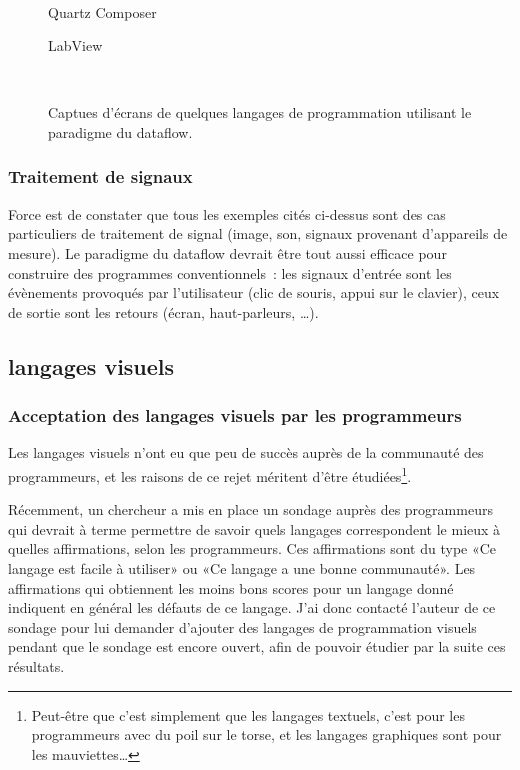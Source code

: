 \documentclass{article}
\begin{document}
\begin{figure}[ht]
  
  {\,}
  \hfill 
  \begin{minipage}{5cm}
    \centering
    \caption{Quartz Composer\cite{quartz-composer}}
    \label{fig:quartz-composer}
  \end{minipage}
  \hfill
  \begin{minipage}{5cm}
    \centering
    \caption{LabView\cite{labview}}
  \end{minipage}
  \hfill
  {\,} 
  \caption{Captues d'écrans de quelques langages de programmation utilisant le paradigme du dataflow.}
  \label{fig:screenshots}
\end{figure}

\subsubsection{Traitement de signaux}

Force est de constater que tous les exemples cités ci-dessus sont des cas particuliers de traitement de signal (image, son, signaux
provenant d'appareils de mesure). Le paradigme du dataflow devrait être tout aussi efficace pour construire des programmes conventionnels~:
les signaux d'entrée sont les évènements provoqués par l'utilisateur (clic de souris, appui sur le clavier), ceux de sortie sont les retours
(écran, haut-parleurs, \dots).

\subsection{langages visuels}

\subsubsection[Acceptation par les programmeurs]{Acceptation des langages visuels par les programmeurs}
Les langages visuels n'ont eu que peu de succès auprès de la communauté des programmeurs, et les raisons de ce rejet méritent d'être
étudiées\footnote{Peut-être que c'est simplement que les langages textuels, c'est pour les programmeurs avec du poil sur le torse, et les
  langages graphiques sont pour les mauviettes…}.

Récemment, un chercheur a mis en place un sondage auprès des programmeurs qui devrait à terme permettre de savoir quels langages
correspondent le mieux à quelles affirmations, selon les programmeurs\cite{the-right-tool}. Ces affirmations sont du type «Ce langage est
facile à utiliser» ou «Ce langage a une bonne communauté». Les affirmations qui obtiennent les moins bons scores pour un langage donné
indiquent en général les défauts de ce langage. J'ai donc contacté l'auteur de ce sondage pour lui demander d'ajouter des langages de
programmation visuels pendant que le sondage est encore ouvert, afin de pouvoir étudier par la suite ces résultats.
\end{document}
